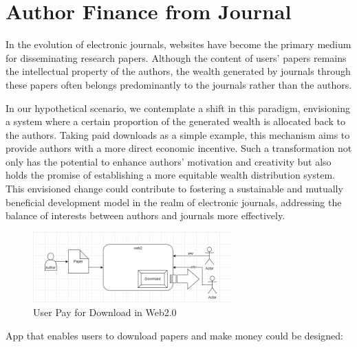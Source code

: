 \documentclass[lettersize,journal]{IEEEtran}
\begin{document}
\section{Author Finance from Journal}


In the evolution of electronic journals, websites have become the primary medium for disseminating research papers. Although the content of users' papers remains the intellectual property of the authors, the wealth generated by journals through these papers often belongs predominantly to the journals rather than the authors.

In our hypothetical scenario, we contemplate a shift in this paradigm, envisioning a system where a certain proportion of the generated wealth is allocated back to the authors. Taking paid downloads as a simple example, this mechanism aims to provide authors with a more direct economic incentive. Such a transformation not only has the potential to enhance authors' motivation and creativity but also holds the promise of establishing a more equitable wealth distribution system. This envisioned change could contribute to fostering a sustainable and mutually beneficial development model in the realm of electronic journals, addressing the balance of interests between authors and journals more effectively.

\begin{figure}[h]
  \includegraphics[width=3in]{assets/web2.png}
  \caption{User Pay for Download in Web2.0}
\end{figure}

App that enables users to download papers and make money could be designed:
\end{document}
